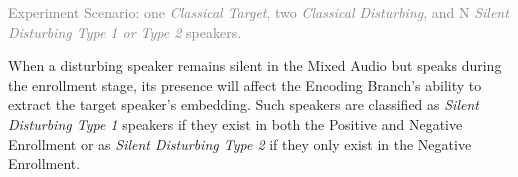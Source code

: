 \begin{table*}[t]
\begin{center}
\begin{small}
\begin{minipage}{0.49\textwidth}
\caption{Model performance when different numbers of \textit{Silent Disturbing Type 2} (SDT2) speakers are present.}
\label{tab:sdt2}
\vskip 0.15in

\end{minipage}
\end{small}
\end{center}
\vskip -0.1in
\end{table*}

\textcolor{gray}{Experiment Scenario: one \textit{Classical Target}, two \textit{Classical Disturbing}, and N \textit{Silent Disturbing Type 1 or Type 2} speakers.}


When a disturbing speaker remains silent in the Mixed Audio but speaks during the enrollment stage, its presence will affect the Encoding Branch's ability to extract the target speaker's embedding. Such speakers are classified as \textit{Silent Disturbing Type 1} speakers if they exist in both the Positive and Negative Enrollment or as \textit{Silent Disturbing Type 2} if they only exist in the Negative Enrollment. 

